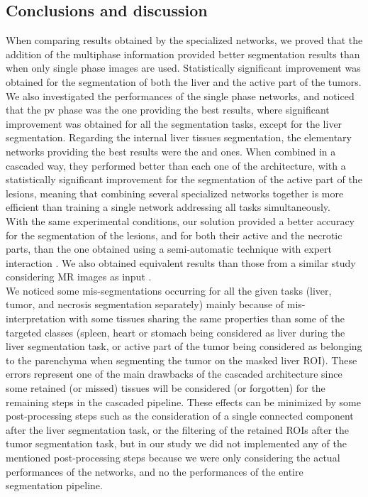 \subsection{Conclusions and discussion}\label{IJCARS_conclusions_and_discussion}

When comparing results obtained by the specialized networks, we proved
that the addition of the multiphase information provided better
segmentation results than when only single phase images are used.
Statistically significant improvement was obtained for the segmentation
of both the liver and the active part of the tumors.
We also investigated the performances of the single phase networks, and
noticed that the \ac{pv} phase was the one providing the best results,
where significant improvement was obtained for all the segmentation
tasks, except for the liver segmentation.
Regarding the internal liver tissues segmentation, the elementary
networks providing the best results were the  
and  ones. When combined in a cascaded way, 
they performed better than each one of the  architecture, 
with a statistically significant improvement
for the segmentation of the active part of the lesions, meaning that 
combining several specialized networks together is more efficient 
than training a single network addressing all tasks simultaneously.\\
With the same experimental conditions, our solution provided a better
accuracy for the segmentation of the lesions, and for both their active
and the necrotic parts, than the one obtained using a semi-automatic
technique with expert interaction \cite{Ouhmich2019,Conze2017}. We also
obtained equivalent results than those from a similar study considering
MR images as input \cite{Zhang2018}.\\
We noticed some mis-segmentations occurring for all the given tasks (liver, tumor, and necrosis segmentation separately) mainly because of mis-interpretation with some tissues sharing the same properties than some of the targeted classes (spleen, heart or stomach being considered as liver during the liver segmentation task, or active part of the tumor being considered as belonging to the parenchyma when segmenting the tumor on the masked liver ROI). These errors represent one of the main drawbacks of the cascaded architecture since some retained (or missed) tissues will be considered (or forgotten) for the remaining steps in the cascaded pipeline. These effects can be minimized by some post-processing steps such as the consideration of a single connected component after the liver segmentation task, or the filtering of the retained ROIs after the tumor segmentation task, but in our study we did not implemented any of the mentioned post-processing steps because we were only considering the actual performances of the networks, and no the performances of the entire segmentation pipeline.


